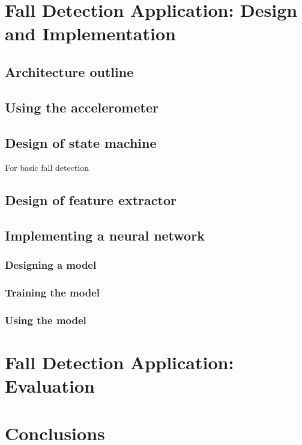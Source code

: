\documentclass[12pt, a4paper, onecolumn]{article}
\begin{document}
	
	\newpage
	\section{Fall Detection Application: Design and Implementation}
	
	\subsection{Architecture outline}
	
	
	
	\subsection{Using the accelerometer}
	
	
	
	\subsection{Design of state machine}
	
	For basic fall detection
	
	\subsection{Design of feature extractor}
	
	\subsection{Implementing a neural network}
	
	\subsubsection{Designing a model}
	
	\subsubsection{Training the model}
	
	\subsubsection{Using the model}
	
	
	
	\newpage
	
	\section{Fall Detection Application: Evaluation}
	\newpage
	
	\section{Conclusions}
	\newpage
		
	
	
\end{document}
